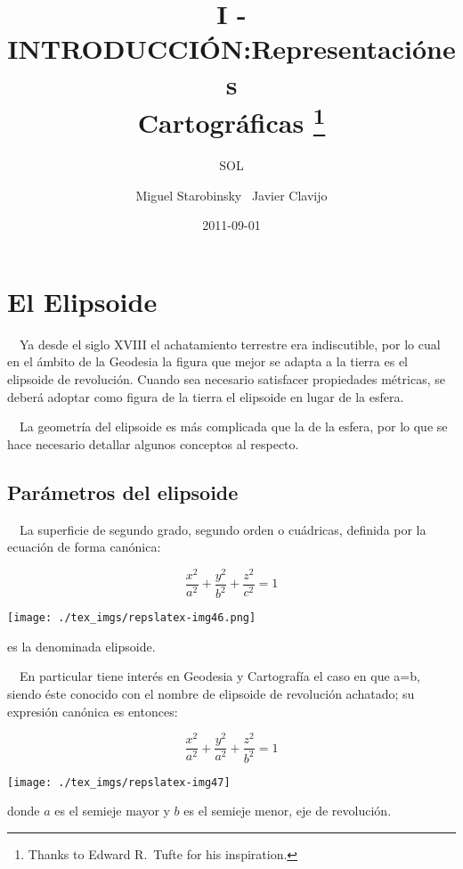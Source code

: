 \documentclass{tufte-book}
\title{I - INTRODUCCIÓN:}
\author{SOL}
\date{2011-09-01}
\title{Representaciónes \\ Cartográficas \thanks{Thanks to Edward R.~Tufte for his inspiration.}}
\author[Miguel Starobinsky \ Javier Clavijo]{Miguel Starobinsky \ Javier Clavijo}
\begin{document}
\maketitle

\section{El Elipsoide}

\ \ Ya desde el siglo XVIII el achatamiento terrestre era indiscutible,
por lo cual en el ámbito de la Geodesia la figura que mejor se adapta
a la tierra es el elipsoide de revolución. Cuando sea necesario
satisfacer propiedades métricas, se deberá adoptar como figura de
la tierra el elipsoide en lugar de la esfera.

\ \ La geometría del elipsoide es más complicada que la de la
esfera, por lo que se hace necesario detallar algunos conceptos al
respecto.

\subsection*{Parámetros del elipsoide}

\ \ La superficie de segundo grado, segundo orden o cuádricas,
definida por la ecuación de forma canónica:

\begin{equation*}
{\frac{x^{{2}}}{a^{{2}}}+\frac{y^{{2}}}{b^{{2}}}+\frac{z^{{2}}}{c^{{2}}}=1}
\end{equation*}

\begin{marginfigure}
\texttt{[image: ./tex\_imgs/repslatex-img46.png]}
\end{marginfigure}
 

es la denominada elipsoide.

\ \ En particular tiene interés en Geodesia y Cartografía el caso en
que a=b, siendo éste conocido con el nombre de elipsoide de
revolución achatado; su expresión canónica es entonces:

\begin{equation*}
{\frac{x^2}{a^2}+\frac{y^2}{a^2}+\frac{z^2}{b^2}=1}
\end{equation*}

\begin{marginfigure}
\texttt{[image: ./tex\_imgs/repslatex-img47]}
\end{marginfigure}
 

donde \(a\) es el semieje mayor y \(b\) es el semieje menor, eje de revolución. 
\end{document}

